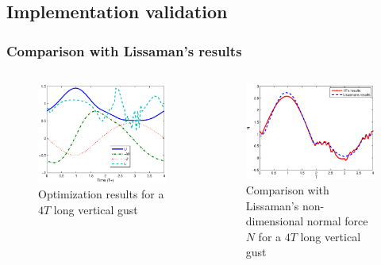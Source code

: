 \documentclass[compress]{beamer}
\begin{document}
\subsection{Implementation validation}

\begin{frame}
  \frametitle{Comparison with Lissaman's results}
  \begin{columns}
    \begin{figure}[ht]
      \begin{center}	
	\includegraphics[width=1\textwidth]{./Figures/Windtype=1_Tg=4_Wg=0p129_quad_G=20.eps}
      \end{center}
      \caption{Optimization results for a $4T$ long vertical gust}
      \label{fig:Validation_optimization}
    \end{figure}
    \begin{figure}[h]
      \centering
      \includegraphics[width=1\textwidth]{./Figures/LIssaman_N_comparison.eps}
      \caption{Comparison with Lissaman's non-dimensional normal force $N$ for a $4T$ long vertical gust}
    \end{figure}
  \end{columns}
\end{frame}
\end{document}
